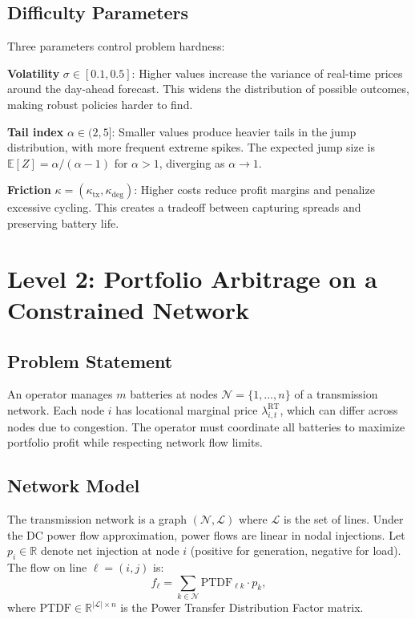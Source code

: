 \documentclass[11pt]{article}
\begin{document}
\subsection{Difficulty Parameters}

Three parameters control problem hardness:

\textbf{Volatility} $\sigma \in [0.1, 0.5]$: Higher values increase the variance of real-time prices around the day-ahead forecast. This widens the distribution of possible outcomes, making robust policies harder to find.

\textbf{Tail index} $\alpha \in (2, 5]$: Smaller values produce heavier tails in the jump distribution, with more frequent extreme spikes. The expected jump size is $\mathbb{E}[Z] = \alpha/(\alpha - 1)$ for $\alpha > 1$, diverging as $\alpha \to 1$.

\textbf{Friction} $\kappa = (\kappa_{\text{tx}}, \kappa_{\text{deg}})$: Higher costs reduce profit margins and penalize excessive cycling. This creates a tradeoff between capturing spreads and preserving battery life.


\section{Level 2: Portfolio Arbitrage on a Constrained Network}

\subsection{Problem Statement}

An operator manages $m$ batteries at nodes $\mathcal{N} = \{1, \ldots, n\}$ of a transmission network. Each node $i$ has locational marginal price $\lambda^{\text{RT}}_{i,t}$, which can differ across nodes due to congestion. The operator must coordinate all batteries to maximize portfolio profit while respecting network flow limits.

\subsection{Network Model}

The transmission network is a graph $(\mathcal{N}, \mathcal{L})$ where $\mathcal{L}$ is the set of lines. Under the DC power flow approximation, power flows are linear in nodal injections. Let $p_i \in \mathbb{R}$ denote net injection at node $i$ (positive for generation, negative for load). The flow on line $\ell = (i,j)$ is:
\begin{equation}
    f_\ell = \sum_{k \in \mathcal{N}} \text{PTDF}_{\ell k} \cdot p_k,
\end{equation}
where $\text{PTDF} \in \mathbb{R}^{|\mathcal{L}| \times n}$ is the Power Transfer Distribution Factor matrix.
\end{document}
